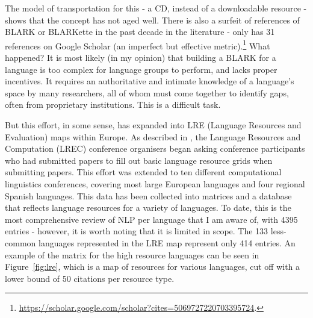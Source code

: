 The model of transportation for this - a CD, instead of a downloadable resource - shows that the concept has not aged well. There is also a surfeit of references of BLARK or BLARKette in the past decade in the literature - \citet{krauwer1998elsnet} only has 31 references on Google Scholar (an imperfect but effective metric).\footnote{\href{https://scholar.google.com/scholar?cites=5069727220703395724}{https://scholar.google.com/scholar?cites=5069727220703395724}. } What happened? It is most likely (in my opinion) that building a BLARK for a language is too complex for language groups to perform, and lacks proper incentives. It requires an authoritative and intimate knowledge of a language's space by many researchers, all of whom must come together to identify gaps, often from proprietary institutions. This is a difficult task.

But this effort, in some sense, has expanded into LRE (Language Resources and Evaluation) maps within Europe. As described in \citet{calzolari2010lrec, del2014lremap, mariani2015language, del2015visualising}, the Language Resources and Computation (LREC) conference organisers began asking conference participants who had submitted papers to fill out basic language resource grids when submitting papers. This effort was extended to ten different computational linguistics conferences, covering most large European languages and four regional Spanish languages. This data has been collected into matrices and a database that reflects language resources for a variety of languages. To date, this is the most comprehensive review of NLP per language that I am aware of, with 4395 entries - however, it is worth noting that it is limited in scope. The 133 less-common languages represented in the LRE map represent only 414 entries. An example of the matrix for the high resource languages can be seen in Figure~\ref{fig:lre}, which is a map of resources for various languages, cut off with a lower bound of 50 citations per resource type.

